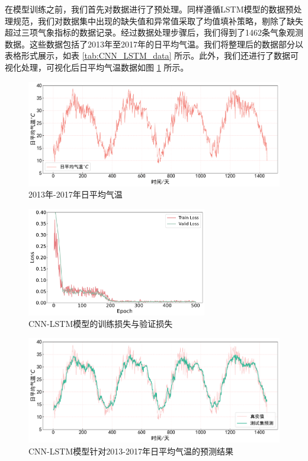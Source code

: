 在模型训练之前，我们首先对数据进行了预处理。同样遵循LSTM模型的数据预处理规范，我们对数据集中出现的缺失值和异常值采取了均值填补策略，剔除了缺失超过三项气象指标的数据记录。经过数据处理步骤后，我们得到了1462条气象观测数据。这些数据包括了2013年至2017年的日平均气温。我们将整理后的数据部分以表格形式展示，如表 \ref{tab:CNN_LSTM_data} 所示。此外，我们还进行了数据可视化处理，可视化后日平均气温数据如图 \ref{fig:4-13-a} 所示。



\begin{figure}[h]
  \centering
  \includegraphics[width=1.0\textwidth]{./Img/CNN_LSTM_origin_data.pdf}
  \caption{2013年-2017年日平均气温}\label{fig:4-13-a}
\end{figure}


\begin{figure}[h]
  \centering
  \includegraphics[width=0.7\textwidth]{./Img/CNN_LSTM_loss.pdf}
  \caption{CNN-LSTM模型的训练损失与验证损失}\label{fig:4-12}
\end{figure}



\begin{figure}[t]
  \centering
  \includegraphics[width=1.0\textwidth]{./Img/CNN_LSTM_test_pre.pdf}
  \caption{CNN-LSTM模型针对2013-2017年日平均气温的预测结果}\label{fig:4-13}
\end{figure}


